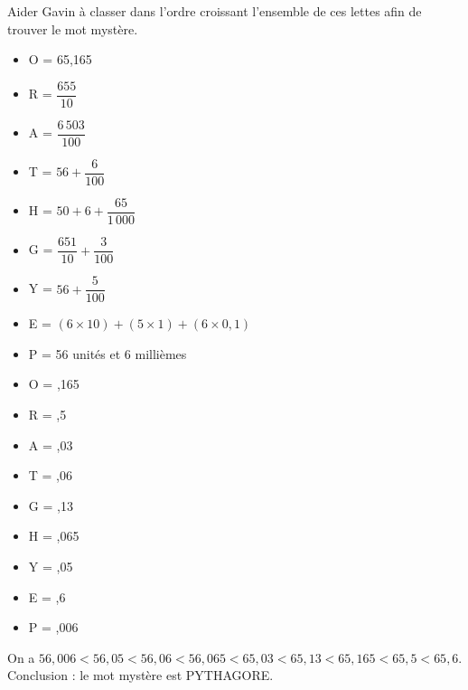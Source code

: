 \begin{exercice} %
    Aider Gavin à classer dans l'ordre croissant l'ensemble de ces lettes afin de trouver le mot mystère. \smallskip
    \begin{itemize}
       \item O = 65,165 \medskip
       \item R = $\dfrac{655}{10}$ \medskip
       \item A = $\dfrac{6\,503}{100}$ \medskip
       \item T = $56+\dfrac{6}{100}$ \medskip
       \item H = $50+6+\dfrac{65}{1\,000}$ \medskip
       \item G = $\dfrac{651}{10}+\dfrac{3}{100}$ \medskip
       \item Y = $56+\dfrac{5}{100}$ \medskip
       \item E = $(6\times10)+(5\times1)+(6\times0,1)$ \smallskip
       \item P = 56 unités et 6 millièmes
    \end{itemize}
 \end{exercice}
 
 \begin{corrige}
    \begin{itemize}
       \item O = ,165
       \item R = ,5
       \item A = ,03
       \item T = ,06
       \item G = ,13
       \item H = ,065
       \item Y = ,05
       \item E = ,6
       \item P = ,006
    \end{itemize}
    On a {\blue $56,006 < 56,05 < 56,06 < 56,065 < 65,03 < 65,13 < 65,165 < 65,5 < 65,6$}. \\
    Conclusion : le mot mystère est \blue PYTHAGORE. \\
 \end{corrige}